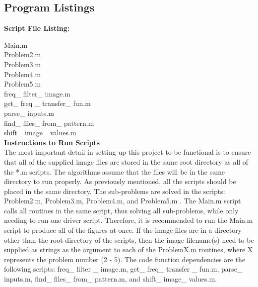 \documentclass[./rarnold_report4.tex]{subfiles}
\begin{document}
\subsection*{Program Listings}

\noindent \textbf{Script File Listing:}

\noindent Main.m \\
Problem2.m \\
Problem3.m \\
Problem4.m \\
Problem5.m \\
freq\_ filter\_ image.m \\
get\_ freq \_ transfer\_ fun.m \\
parse\_ inputs.m \\
find\_ files\_ from\_ pattern.m \\
shift\_ image\_ values.m \\


\noindent \textbf{Instructions to Run Scripts} \\

\noindent The most important detail in setting up this project to be functional is to ensure that all of the supplied image files are stored in the same root directory as all of the *.m scripts.  The algorithms assume that the files will be in the same directory to run properly.  As previously mentioned, all the scripts should be placed in the same directory.  The sub-problems are solved in the scripts: Problem2.m, Problem3.m, Problem4.m, and Problem5.m .  The Main.m script calls all routines in the same script, thus solving all sub-problems, while only needing to run one driver script.  Therefore, it is recommended to run the Main.m script to produce all of the figures at once.  If the image files are in a directory other than the root directory of the scripts, then the image filename(s) need to be supplied as strings as the argument to each of the ProblemX.m routines, where X represents the problem number (2 - 5).  The code function dependencies are the following scripts: freq\_ filter \_ image.m, get\_ freq\_ transfer \_ fun.m, parse\_ inputs.m, find\_ files\_ from\_ pattern.m, and shift\_ image\_ values.m.
\end{document}
